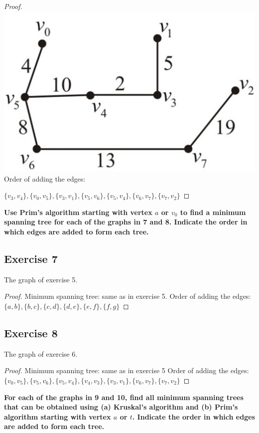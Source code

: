\documentclass[14pt]{extarticle}
\newcommand{\cy}{\color{cyan}}
\begin{document}
\begin{proof}
    \includegraphics[scale=0.2]{../images/10.6.6.2.png} Order of adding the edges:

    \(\{v_3, v_4\}, \{v_0, v_5\}, \{v_3, v_1\}, \{v_5, v_6\}, \{v_5, v_4\}, \{v_6, v_7\}, \{v_7, v_2\}\)
\end{proof}

{\bf \cy Use Prim’s algorithm starting with vertex \(a\) or \(v_0\) to find a minimum spanning tree for each of the graphs
in 7 and 8. Indicate the order in which edges are added to form each tree.}

\subsection{Exercise 7}
The graph of exercise 5.
\begin{proof}
    Minimum spanning tree: same as in exercise 5. Order of adding the edges:
    \(\{a, b\}, \{b, c\}, \{c, d\}, \{d, e\}, \{e, f\}, \{f, g\}\)
\end{proof}

\subsection{Exercise 8}
The graph of exercise 6.
\begin{proof}
    Minimum spanning tree: same as in exercise 5 Order of adding the edges: \(\{v_0, v_5\}, \{v_5, v_6\}, \{v_5, v_4\},
    \{v_4, v_3\}, \{v_3, v_1\}, \{v_6, v_7\}, \{v_7, v_2\}\)
\end{proof}

{\bf \cy For each of the graphs in 9 and 10, find all minimum spanning trees that can be obtained using (a) Kruskal’s
algorithm and (b) Prim’s algorithm starting with vertex \(a\) or \(t\). Indicate the order in which edges are added to form
each tree.}
\end{document}
